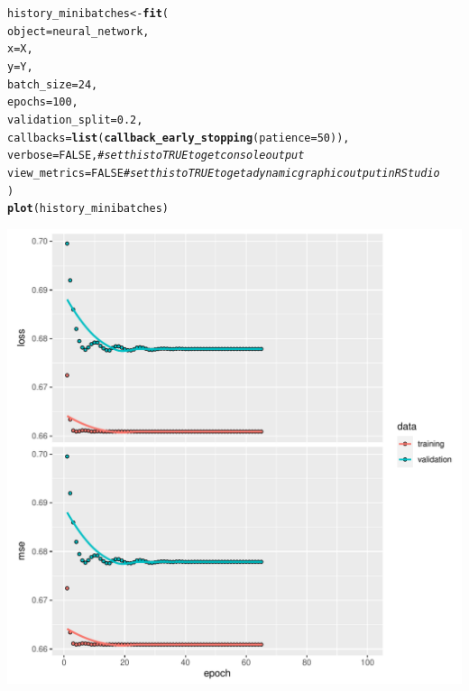 \documentclass[a4paper]{article}
\makeatletter
\def\maxwidth{ %
  \ifdim\Gin@nat@width>\linewidth
    \linewidth
  \else
    \Gin@nat@width
  \fi
}
\newcommand{\hlnum}[1]{\textcolor[rgb]{0.686,0.059,0.569}{#1}}%
\newcommand{\hlcom}[1]{\textcolor[rgb]{0.678,0.584,0.686}{\textit{#1}}}%
\newcommand{\hlstd}[1]{\textcolor[rgb]{0.345,0.345,0.345}{#1}}%
\newcommand{\hlkwb}[1]{\textcolor[rgb]{0.69,0.353,0.396}{#1}}%
\newcommand{\hlkwc}[1]{\textcolor[rgb]{0.333,0.667,0.333}{#1}}%
\newcommand{\hlkwd}[1]{\textcolor[rgb]{0.737,0.353,0.396}{\textbf{#1}}}%
\newenvironment{kframe}{%
 \def\at@end@of@kframe{}%
 \ifinner\ifhmode%
  \def\at@end@of@kframe{\end{minipage}}%
  \begin{minipage}{\columnwidth}%
 \fi\fi%
 \def\FrameCommand##1{\hskip\@totalleftmargin \hskip-\fboxsep
 \colorbox{shadecolor}{##1}\hskip-\fboxsep
     \hskip-\linewidth \hskip-\@totalleftmargin \hskip\columnwidth}%
 \MakeFramed {\advance\hsize-\width
   \@totalleftmargin\z@ \linewidth\hsize
   \@setminipage}}%
 {\par\unskip\endMakeFramed%
 \at@end@of@kframe}
\newenvironment{knitrout}{}{} %
\makeatother
\begin{document}
{\begin{enumerate}
\begin{itemize}
\begin{knitrout}
\begin{kframe}
\begin{alltt}
\hlstd{history_minibatches} \hlkwb{<-} \hlkwd{fit}\hlstd{(}
  \hlkwc{object}           \hlstd{= neural_network,}
  \hlkwc{x}                \hlstd{= X,}
  \hlkwc{y}                \hlstd{= Y,}
  \hlkwc{batch_size}       \hlstd{=} \hlnum{24}\hlstd{,}
  \hlkwc{epochs}           \hlstd{=} \hlnum{100}\hlstd{,}
  \hlkwc{validation_split} \hlstd{=} \hlnum{0.2}\hlstd{,}
  \hlkwc{callbacks} \hlstd{=} \hlkwd{list}\hlstd{(}\hlkwd{callback_early_stopping}\hlstd{(}\hlkwc{patience} \hlstd{=} \hlnum{50}\hlstd{)),}
  \hlkwc{verbose} \hlstd{=} \hlnum{FALSE}\hlstd{,} \hlcom{# set this to TRUE to get console output}
  \hlkwc{view_metrics} \hlstd{=} \hlnum{FALSE} \hlcom{# set this to TRUE to get a dynamic graphic output in RStudio}
\hlstd{)}
\hlkwd{plot}\hlstd{(history_minibatches)}
\end{alltt}
\end{kframe}
\includegraphics[width=\maxwidth]{figure/unnamed-chunk-11-1} 
\end{knitrout}
\end{itemize}
\end{enumerate}
}
\newpage
\end{document}
